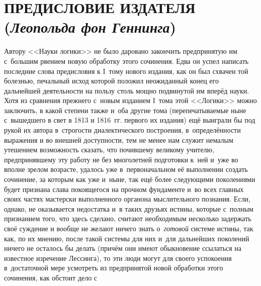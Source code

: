 
\chapter[\mdseries Предисловие издателя (Леопольда фон Геннинга)]%
[Предисловие издателя]%
{ПРЕДИСЛОВИЕ ИЗДАТЕЛЯ\\({\em Леопольда фон Геннинга\/})}

Автору <<Науки логики>> не было даровано закончить предпринятую им с~большим
рвением новую обработку этого сочинения. Едва он успел написать последние
слова предисловия к I~тому нового издания, как он был схвачен той болезнью,
печальный исход которой положил неожиданный конец его дальнейшей
деятельности на пользу столь мощно подвинутой им вперёд науки. Хотя из
сравнения прежнего с~новым изданием I~тома этой <<Логики>> можно заключить, в
какой степени также и~оба другие тома (перепечатываемые ныне с~вышедшего в
свет в 1813 и 1816~гг. первого их издания) ещё выиграли бы под рукой их
автора в~строгости диалектического построения, в~определённости выражения и
во внешней доступности, тем не менее нам служит немалым утешением
возможность сказать, что почившему великому учителю, предпринявшему эту
работу не без многолетней подготовки к~ней и~уже во вполне зрелом возрасте,
удалось уже в~первоначальном её выполнении создать сочинение, за которым
как уже и~ныне, так ещё более следующими поколениями будет признана слава
покоящегося на прочном фундаменте и~во всех главных своих частях мастерски
выполненного органона мыслительного познания. Если, однако, не оказывается
недостатка и~в таких друзьях истины, которые с~полным признанием того, что
здесь сделано, считают необходимым несколько задержать своё суждение и
вообще не желают ничего знать о~{\em готовой} системе
истины, так как, по их мнению, после такой системы для них и~для дальнейших
поколений ничего не осталось бы делать (причём они имеют обыкновение
ссылаться на известное изречение Лессинга), то эти люди могут для своего успокоения в~достаточной мере
усмотреть из предпринятой новой обработки этого сочинения, как обстоит дело с
